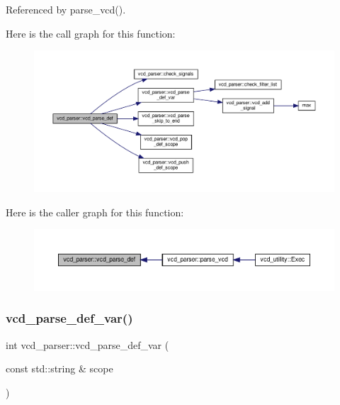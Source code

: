 Referenced by parse\+\_\+vcd().

Here is the call graph for this function\+:
\nopagebreak
\begin{figure}[H]
\begin{center}
\leavevmode
\includegraphics[width=350pt]{d2/d25/classvcd__parser_af2b5f48a0d18667c418a500fb78b52e7_cgraph}
\end{center}
\end{figure}
Here is the caller graph for this function\+:
\nopagebreak
\begin{figure}[H]
\begin{center}
\leavevmode
\includegraphics[width=350pt]{d2/d25/classvcd__parser_af2b5f48a0d18667c418a500fb78b52e7_icgraph}
\end{center}
\end{figure}
\mbox{\label{classvcd__parser_add86b6565edba7e85a6508594798f56a}} 
\subsubsection{\texorpdfstring{vcd\+\_\+parse\+\_\+def\+\_\+var()}{vcd\_parse\_def\_var()}}
{\footnotesize\ttfamily int vcd\+\_\+parser\+::vcd\+\_\+parse\+\_\+def\+\_\+var (\begin{DoxyParamCaption}\item[{const std\+::string \&}]{scope }\end{DoxyParamCaption})\hspace{0.3cm}{\ttfamily [private]}}



